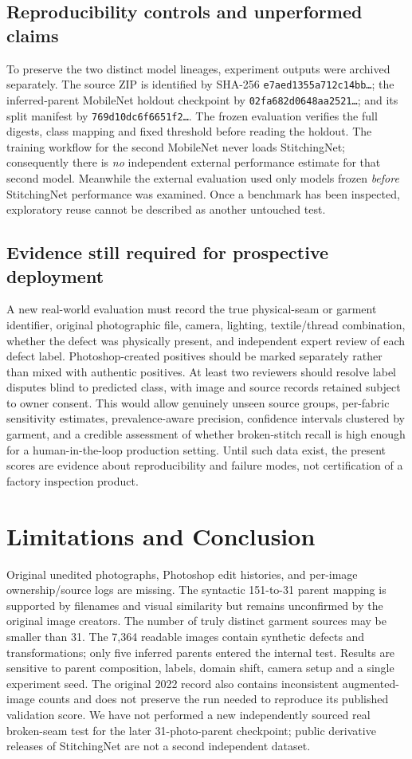 \documentclass[conference,a4paper]{IEEEtran}
\begin{document}
\subsection{Reproducibility controls and unperformed claims}
To preserve the two distinct model lineages, experiment outputs were archived separately. The source ZIP is identified by SHA-256 \texttt{e7aed1355a712c14bb\ldots}; the inferred-parent MobileNet holdout checkpoint by \texttt{02fa682d0648aa2521\ldots}; and its split manifest by \texttt{769d10dc6f6651f2\ldots}. The frozen evaluation verifies the full digests, class mapping and fixed threshold before reading the holdout. The training workflow for the second MobileNet never loads StitchingNet; consequently there is \emph{no} independent external performance estimate for that second model. Meanwhile the external evaluation used only models frozen \emph{before} StitchingNet performance was examined. Once a benchmark has been inspected, exploratory reuse cannot be described as another untouched test.

\subsection{Evidence still required for prospective deployment}
A new real-world evaluation must record the true physical-seam or garment identifier, original photographic file, camera, lighting, textile/thread combination, whether the defect was physically present, and independent expert review of each defect label. Photoshop-created positives should be marked separately rather than mixed with authentic positives. At least two reviewers should resolve label disputes blind to predicted class, with image and source records retained subject to owner consent. This would allow genuinely unseen source groups, per-fabric sensitivity estimates, prevalence-aware precision, confidence intervals clustered by garment, and a credible assessment of whether broken-stitch recall is high enough for a human-in-the-loop production setting. Until such data exist, the present scores are evidence about reproducibility and failure modes, not certification of a factory inspection product.

\section{Limitations and Conclusion}
Original unedited photographs, Photoshop edit histories, and per-image ownership/source logs are missing. The syntactic 151-to-31 parent mapping is supported by filenames and visual similarity but remains unconfirmed by the original image creators. The number of truly distinct garment sources may be smaller than 31. The 7,364 readable images contain synthetic defects and transformations; only five inferred parents entered the internal test. Results are sensitive to parent composition, labels, domain shift, camera setup and a single experiment seed. The original 2022 record also contains inconsistent augmented-image counts and does not preserve the run needed to reproduce its published validation score. We have not performed a new independently sourced real broken-seam test for the later 31-photo-parent checkpoint; public derivative releases of StitchingNet are not a second independent dataset.
\end{document}
